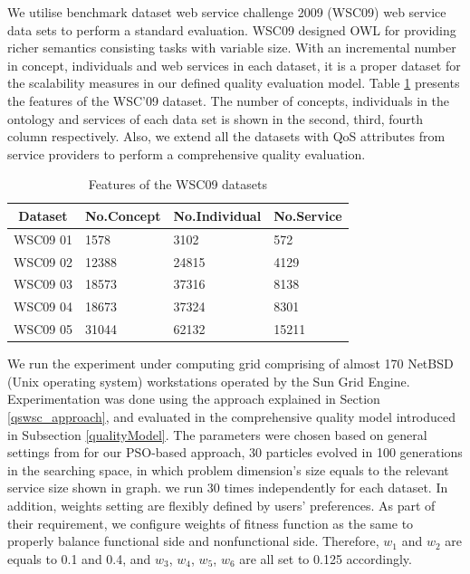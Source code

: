 \documentclass{llncs}
\begin{document}
We utilise benchmark dataset web service challenge 2009 (WSC09) \cite{kona2009wsc} web service data sets to perform a standard evaluation. WSC09 designed OWL for providing richer semantics consisting tasks with variable size. With an incremental number in concept, individuals and web services in each dataset, it is a proper dataset for the scalability measures in our defined quality evaluation model. Table \ref{wsc09datasetTable} presents the features of the WSC’09 dataset. The number of concepts, individuals in the ontology and services of each data set is shown in the second, third, fourth column respectively. Also, we extend all the datasets with QoS attributes from service providers to perform a comprehensive quality evaluation. 
\begin{table}[]
\centering
\caption{Features of the WSC09 datasets}
\label{wsc09datasetTable}
\begin{tabular}{|l|l|l|l|}
\hline
\multicolumn{1}{|c|}{Dataset} & No.Concept & No.Individual & No.Service \\ \hline
WSC09 01                     & 1578       &3102           &572      \\ \hline
WSC09 02                     & 12388      &24815          &4129      \\ \hline
WSC09 03                     & 18573      &37316          &8138      \\ \hline
WSC09 04                     & 18673      &37324          &8301      \\ \hline
WSC09 05                     & 31044      &62132          &15211    \\ \hline
\end{tabular}
\end{table}


We run the experiment under computing grid comprising of almost 170 NetBSD (Unix operating system) workstations operated by the Sun Grid Engine. Experimentation was done using the approach explained in Section \ref{qswsc_approach}, and evaluated in the comprehensive quality model introduced in Subsection \ref{qualityModel}. The parameters were chosen based on general settings from \cite{shi2001particle} for our PSO-based approach, 30 particles evolved in 100 generations in the searching space, in which problem dimension's size equals to the relevant service size shown in graph. we run 30 times independently for each dataset. In addition, weights setting are flexibly defined by users' preferences. As part of their requirement, we configure weights of fitness function as the same to properly balance functional side and nonfunctional side. Therefore, $w_{1}$ and $w_{2}$ are equals to 0.1 and 0.4,  and $w_{3}$, $w_{4}$, $w_{5}$, $w_{6}$ are all set to 0.125 accordingly.
\end{document}
